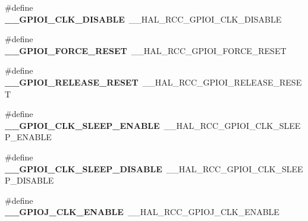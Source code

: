 \begin{DoxyCompactItemize}
\item 
\#define {\bfseries \+\_\+\+\_\+\+G\+P\+I\+O\+I\+\_\+\+C\+L\+K\+\_\+\+D\+I\+S\+A\+B\+LE}~\+\_\+\+\_\+\+H\+A\+L\+\_\+\+R\+C\+C\+\_\+\+G\+P\+I\+O\+I\+\_\+\+C\+L\+K\+\_\+\+D\+I\+S\+A\+B\+LE\hypertarget{group___h_a_l___r_c_c___aliased_gaec33167cdc798a48f031e5f06b449e6d}{}\label{group___h_a_l___r_c_c___aliased_gaec33167cdc798a48f031e5f06b449e6d}

\item 
\#define {\bfseries \+\_\+\+\_\+\+G\+P\+I\+O\+I\+\_\+\+F\+O\+R\+C\+E\+\_\+\+R\+E\+S\+ET}~\+\_\+\+\_\+\+H\+A\+L\+\_\+\+R\+C\+C\+\_\+\+G\+P\+I\+O\+I\+\_\+\+F\+O\+R\+C\+E\+\_\+\+R\+E\+S\+ET\hypertarget{group___h_a_l___r_c_c___aliased_ga26e794bff0014f0fd53afed5a5aa2979}{}\label{group___h_a_l___r_c_c___aliased_ga26e794bff0014f0fd53afed5a5aa2979}

\item 
\#define {\bfseries \+\_\+\+\_\+\+G\+P\+I\+O\+I\+\_\+\+R\+E\+L\+E\+A\+S\+E\+\_\+\+R\+E\+S\+ET}~\+\_\+\+\_\+\+H\+A\+L\+\_\+\+R\+C\+C\+\_\+\+G\+P\+I\+O\+I\+\_\+\+R\+E\+L\+E\+A\+S\+E\+\_\+\+R\+E\+S\+ET\hypertarget{group___h_a_l___r_c_c___aliased_ga33dcd5e32000cc2af55b91764ce07218}{}\label{group___h_a_l___r_c_c___aliased_ga33dcd5e32000cc2af55b91764ce07218}

\item 
\#define {\bfseries \+\_\+\+\_\+\+G\+P\+I\+O\+I\+\_\+\+C\+L\+K\+\_\+\+S\+L\+E\+E\+P\+\_\+\+E\+N\+A\+B\+LE}~\+\_\+\+\_\+\+H\+A\+L\+\_\+\+R\+C\+C\+\_\+\+G\+P\+I\+O\+I\+\_\+\+C\+L\+K\+\_\+\+S\+L\+E\+E\+P\+\_\+\+E\+N\+A\+B\+LE\hypertarget{group___h_a_l___r_c_c___aliased_ga21fb63ab15ee9924ef806396fb0d8040}{}\label{group___h_a_l___r_c_c___aliased_ga21fb63ab15ee9924ef806396fb0d8040}

\item 
\#define {\bfseries \+\_\+\+\_\+\+G\+P\+I\+O\+I\+\_\+\+C\+L\+K\+\_\+\+S\+L\+E\+E\+P\+\_\+\+D\+I\+S\+A\+B\+LE}~\+\_\+\+\_\+\+H\+A\+L\+\_\+\+R\+C\+C\+\_\+\+G\+P\+I\+O\+I\+\_\+\+C\+L\+K\+\_\+\+S\+L\+E\+E\+P\+\_\+\+D\+I\+S\+A\+B\+LE\hypertarget{group___h_a_l___r_c_c___aliased_gabdcc722303d0c5cc8025cd0654f4352a}{}\label{group___h_a_l___r_c_c___aliased_gabdcc722303d0c5cc8025cd0654f4352a}

\item 
\#define {\bfseries \+\_\+\+\_\+\+G\+P\+I\+O\+J\+\_\+\+C\+L\+K\+\_\+\+E\+N\+A\+B\+LE}~\+\_\+\+\_\+\+H\+A\+L\+\_\+\+R\+C\+C\+\_\+\+G\+P\+I\+O\+J\+\_\+\+C\+L\+K\+\_\+\+E\+N\+A\+B\+LE\hypertarget{group___h_a_l___r_c_c___aliased_ga9306d046c939c0d6afb3e8bb48b69974}{}\label{group___h_a_l___r_c_c___aliased_ga9306d046c939c0d6afb3e8bb48b69974}


\end{DoxyCompactItemize}
